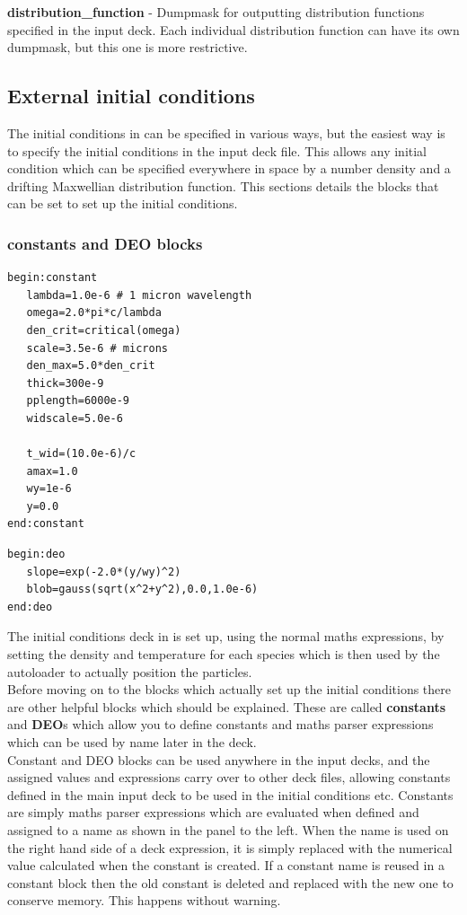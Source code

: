 \documentclass[12pt,a4paper]{article}
\newcommand{\emphtext}{\color{warwickdark} \fontfamily{phv}\selectfont\Large\bf}
\newcommand{\boxverbatim}[1]{\begin{Verbatim}[obeytabs=true,frame=single,
  framerule=0.5mm,rulecolor=\color{warwickmid},formatcom=\color{black},label=#1]}
\newcommand{\inlineemph}[1]{{\color{warwicklight} \bf{#1}}}
\newcommand{\EPOCH}{{\color{warwickdark}\fontfamily{phv}\selectfont{EPOCH}}}
\begin{document}
{\emphtext distribution\_function} - Dumpmask for outputting distribution
functions specified in the input deck. Each individual distribution function
can have its own dumpmask, but this one is more restrictive.\\

\subsection{External initial conditions}

The initial conditions in {\EPOCH} can be specified in various ways, but the
easiest way is to specify the initial conditions in the input deck file. This
allows any initial condition which can be specified everywhere in space by a
number density and a drifting Maxwellian distribution function. This sections
details the blocks that can be set to set up the initial conditions.

\subsubsection{\inlineemph{constants} and \inlineemph{DEO} blocks}

\boxverbatim{constant block}
begin:constant
   lambda=1.0e-6 # 1 micron wavelength
   omega=2.0*pi*c/lambda
   den_crit=critical(omega)
   scale=3.5e-6 # microns
   den_max=5.0*den_crit
   thick=300e-9
   pplength=6000e-9
   widscale=5.0e-6

   t_wid=(10.0e-6)/c
   amax=1.0
   wy=1e-6
   y=0.0
end:constant
\end{Verbatim}

\boxverbatim{deo block}
begin:deo
   slope=exp(-2.0*(y/wy)^2)
   blob=gauss(sqrt(x^2+y^2),0.0,1.0e-6)
end:deo
\end{Verbatim}

The initial conditions deck in {\EPOCH} is set up, using the normal maths
expressions, by setting the density and temperature for each species which is
then used by the autoloader to actually position the particles.\\

Before moving on to the blocks which actually set up the initial conditions
there are other helpful blocks which should be explained. These are called
\inlineemph{constants} and \inlineemph{DEO}s which allow you to define
constants and maths parser expressions which can be used by name later in the
deck.\\

Constant and DEO blocks can be used anywhere in the input decks, and the
assigned values and expressions carry over to other deck files, allowing
constants defined in the main input deck to be used in the initial conditions
etc. Constants are simply maths parser expressions which are evaluated when
defined and assigned to a name as shown in the panel to the left. When the name
is used on the right hand side of a deck expression, it is simply replaced with
the numerical value calculated when the constant is created.  If a constant
name is reused in a constant block then the old constant is deleted and
replaced with the new one to conserve memory. This happens without warning.\\
\end{document}

